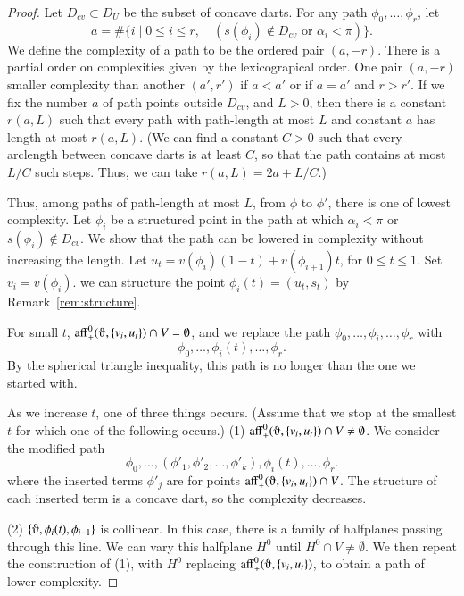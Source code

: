 \begin{proof}  
Let $D_{cv}\subset D_U$ be the subset of concave darts.  For
any path $\phi_0,\ldots,\phi_r$, let
   $$a = \#\{i \mid 0\le i\le r,\quad (s(\phi_i)\not\in D_{cv} \text{ or }
       \alpha_i < \pi)\}.$$
We define the complexity of a path to be the ordered pair $(a,-r)$.
There is a partial order on complexities given by the lexicograpical order.
One pair $(a,-r)$ smaller complexity than another $(a',r')$ if $a<a'$
or if $a=a'$ and $r>r'$.  If we fix the number $a$ of path points outside
$D_{cv}$, and  $L>0$, then there is a constant $r(a,L)$ such
that every path with path-length at most $L$ and constant $a$ has length at
most $r(a,L)$.  (We can find a constant $C>0$ such that every
arclength between concave darts is at least $C$, so that the path contains at most $L/C$ such steps.  Thus, we can take $r(a,L) = 2 a + L/C$.)

Thus, among paths of path-length at most $L$, from $\phi$ to $\phi'$,
there is one of lowest complexity. 
Let $\phi_i$ be a structured point in the path at which $\alpha_i <\pi$
or $s(\phi_i)\not\in D_{cv}$.  
We show that the path can be lowered in
complexity without increasing the length.
Let $u_t = v(\phi_i) (1-t) + v(\phi_{i+1}) t$, for $0\le t\le 1$.
Set $v_i = v(\phi_i)$.  
we can structure the point $\phi_i(t)=(u_t,s_t)$ by Remark~\ref{rem:structure}.

For small $t$, $\op{aff}_+^0(\orgn,\{v_i,u_t\})\cap V=\emptyset$, and
we replace the path $\phi_0,\ldots,\phi_i,\ldots,\phi_r$
with 
   $$
   \phi_0,\ldots,\phi_i(t),\ldots,
   \phi_r.
   $$
By the spherical triangle inequality, this path is no longer than
the one we started with.

As we increase $t$, one of three things occurs.  (Assume that
we stop at the smallest $t$ for which one of the following occurs.)
(1)  $\op{aff}_+^0(\orgn,\{v_i,u_t\})\cap V\ne\emptyset$.
We consider the modified path
 $$
   \phi_0,\ldots,
   (\phi'_1,\phi'_2,\ldots,\phi'_k),\phi_i(t),\ldots,
   \phi_r.
   $$
where the inserted terms $\phi'_j$ are for points 
 $\op{aff}_+^0(\orgn,\{v_i,u_t\})\cap V$. The structure of each
inserted term is a concave dart, so the complexity decreases.

(2) $\{\orgn,\phi_i(t),\phi_{i-1}\}$ is collinear.  In this case,
there is a family of halfplanes passing through this line.  We can
vary this halfplane $H^0$ until $H^0\cap V\ne\emptyset$.  
We then repeat the construction of (1), with $H^0$ replacing
$\op{aff}_+^0(\orgn,\{v_i,u_t\})$, to obtain a path of lower complexity.


\end{proof}
